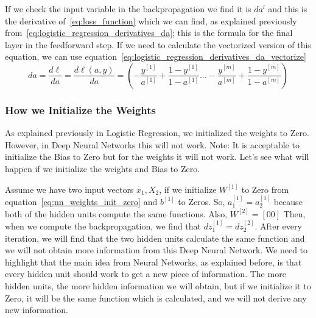 If we check the input variable in the backpropagation we find it is $da^{l}$ and this is the derivative of~\eqref{eq:loss_function} which we can find, as explained previously from~\eqref{eq:logistic_regression_derivatives_da}; this is the formula for the final layer in the feedforward step. If we need to calculate the vectorized version of this equation, we can use equation~\eqref{eq:logistic_regression_derivatives_da_vectorize}
\begin{equation}\label{eq:logistic_regression_derivatives_da_vectorize}
da = \frac{d\ell}{da} = \frac{d\ell(a,y)}{da} = (- \frac{y^{[1]}}{a^{[1]}} + \frac{1-y^{[1]}}{1-a^{[1]}} \ldots - \frac{y^{[m]}}{a^{[m]}} + \frac{1-y^{[m]}}{1-a^{[m]}} )
\end{equation}%

\subsubsection{How we Initialize the Weights}

As explained previously in Logistic Regression, we initialized the weights to Zero. However, in Deep Neural Networks this will not work. Note: It is acceptable to initialize the Bias to Zero but for the weights it will not work. Let's see what will happen if we initialize the weights and Bias to Zero. %
  
Assume  we have two input vectors $x_1,X_2$, if we initialize $W^{[1]}$ to Zero from equation~\eqref{eq:nn_weights_init_zero} and $b^{[1]}$ to Zeros. So, $a_1^{[1]}=a_2^{[1]}$ because both of the hidden units compute the same functions. Also, $W^{[2]}=[0 0]$ Then, when we compute the backpropagation, we find that $dz_1^{[1]}=dz_2^{[2]}$. After every iteration, we will find that the two hidden units calculate the same function and we will not obtain more information from this Deep Neural Network. We need to highlight that the main idea from Neural Networks, as explained before, is that every hidden unit should work to get a new piece of information. The more hidden units, the more hidden information we will obtain, but if we initialize it to Zero, it will be the same function which is calculated, and we will not derive any new information.%

